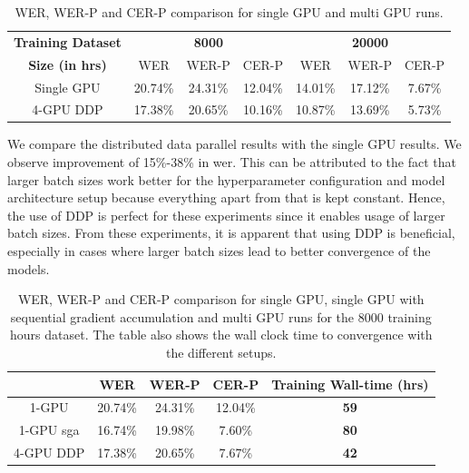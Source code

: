 \begin{table}[ht]
\centering
\begin{tabular}{c | c c c | c c c }
\hline
\textbf{Training Dataset} & \multicolumn{3}{c|}{\textbf{8000}} & \multicolumn{3}{c}{\textbf{20000}}\\\cline{2-7}
   \textbf{Size (in hrs)} & WER & WER-P & CER-P & WER & WER-P & CER-P\\
 \hline
  Single GPU & 20.74\% & 24.31\% & 12.04\% & 14.01\% & 17.12\% & 7.67\%\\
  4-GPU DDP & 17.38\% & 20.65\% & 10.16\% & 10.87\% & 13.69\% & 5.73\% \\
 \hline
\end{tabular}
\caption{\label{table:wer_ddp} WER, WER-P and CER-P comparison for single GPU and multi GPU runs.}
\end{table}

We compare the distributed data parallel results with the single GPU results. We observe improvement of 15\%-38\% in \acrshort{wer}. This can be attributed to the fact that larger batch sizes work better for the hyperparameter configuration and model architecture setup because everything apart from that is kept constant. Hence, the use of DDP is perfect for these experiments since it enables usage of larger batch sizes. From these experiments, it is apparent that using DDP is beneficial, especially in cases where larger batch sizes lead to better convergence of the models. 


\begin{table}[ht]
\centering
\begin{tabular}{c | c c c | c }
\hline
     & WER & WER-P & CER-P & Training Wall-time (hrs)\\
 \hline
  1-GPU & 20.74\% & 24.31\% & 12.04\% & \textbf{59} \\
  1-GPU \acrshort{sga} & 16.74\% & 19.98\% & 7.60\% & \textbf{80} \\
  4-GPU DDP & 17.38\% & 20.65\% & 7.67\% & \textbf{42} \\
 \hline
\end{tabular}
\caption{\label{table:wer_ddp_grad} WER, WER-P and CER-P comparison for single GPU, single GPU with sequential gradient accumulation and multi GPU runs for the 8000 training hours dataset. The table also shows the wall clock time to convergence with the different setups.}
\end{table}

